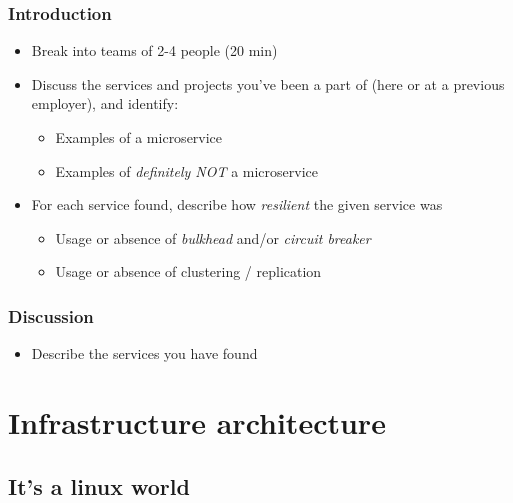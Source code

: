\documentclass[8pt]{article}
\begin{document}
\subsubsection{Introduction}
\label{sec:orgeb7ff6d}
\begin{itemize}
\item Break into teams of 2-4 people (20 min)
\item Discuss the services and projects you've been a part of (here or at a previous employer), and identify:
\begin{itemize}
\item Examples of a microservice
\item Examples of \emph{definitely NOT} a microservice
\end{itemize}

\item For each service found, describe how \emph{resilient} the given service was
\begin{itemize}
\item Usage or absence of \emph{bulkhead} and/or \emph{circuit breaker}
\item Usage or absence of clustering / replication
\end{itemize}
\end{itemize}

\subsubsection{Discussion}
\label{sec:org041cae8}
\begin{itemize}
\item Describe the services you have found
\end{itemize}
\section{Infrastructure architecture}
\label{sec:orgc369c36}
\subsection{It's a linux world}
\label{sec:org613b2e4}
\end{document}
